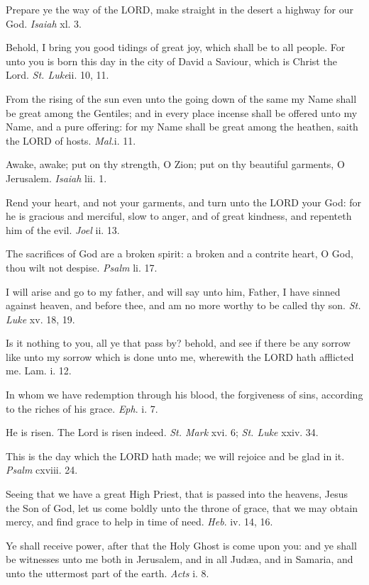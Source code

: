 Prepare ye the way of the LORD,
make straight in the desert a highway for our God. \emph{Isaiah}
xl. 3.

Behold, I bring you good tidings of great joy, which shall be to all people.
For unto you is born this day in the city of David a Saviour, which is
Christ the Lord. \emph{St. Luke}ii. 10, 11.

From the rising of the sun even unto the going down of the same my Name
shall be great among the Gentiles; and in every place incense shall be
offered unto my Name, and a pure offering: for my Name shall be great
among the heathen, saith the LORD of hosts. \emph{Mal.}i. 11.

Awake, awake; put on thy strength, O Zion; put on thy
beautiful garments, O Jerusalem. \emph{Isaiah} lii. 1.

Rend your heart, and not your garments, and turn unto the LORD
your God: for he is gracious and merciful, slow to anger, and of great
kindness, and repenteth him of the evil. \emph{Joel} ii. 13.

The sacrifices of God are a broken spirit: a broken
and a contrite heart, O God, thou wilt not despise. \emph{Psalm}
li. 17.

I will arise and go to my father, and will say unto
him, Father, I have sinned against heaven, and before thee, and am no
more worthy to be called thy son. \emph{St. Luke} xv. 18, 19.

Is it nothing to you, all ye that pass by? behold, and see if there be
any sorrow like unto my sorrow which is done unto me, wherewith the LORD
hath afflicted me. Lam. i. 12.

In whom we have redemption through his blood, the forgiveness
of sins, according to the riches of his grace. \emph{Eph}. i.
7.

He is risen. The Lord is risen indeed. \emph{St. Mark} xvi. 6;
\emph{St. Luke} xxiv. 34.

This is the day which the LORD
hath made; we will rejoice and be glad in it. \emph{Psalm} cxviii.
24.

Seeing that we have a great High Priest, that is passed into the heavens,
Jesus the Son of God, let us come boldly unto the throne of grace, that
we may obtain mercy, and find grace to help in time of need. \emph{Heb}.
iv. 14, 16.

Ye shall receive power, after that the Holy Ghost is come upon you: and
ye shall be witnesses unto me both in Jerusalem, and in all Judæa,
and in Samaria, and unto the uttermost part of the earth. \emph{Acts}
i. 8.

